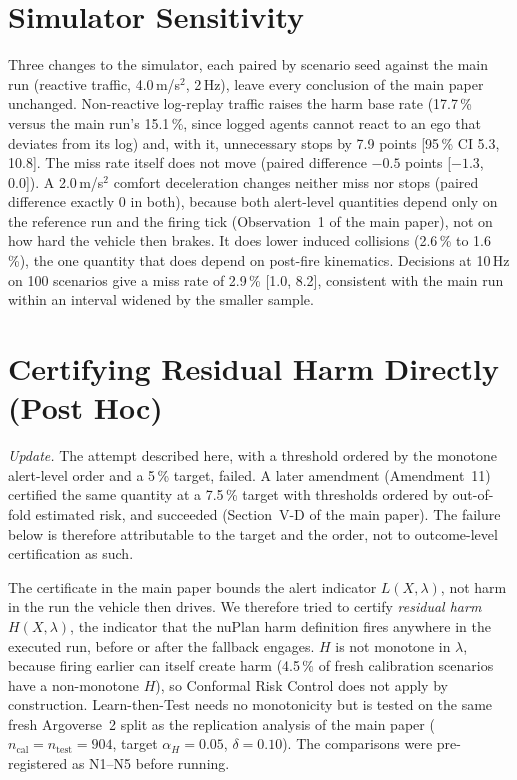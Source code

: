 \documentclass[lettersize,journal]{IEEEtran}
\begin{document}
\section{Simulator Sensitivity}
\label{sec:s-sens}
Three changes to the simulator, each paired by scenario seed against the
main run (reactive traffic, 4.0\,m/s$^2$, 2\,Hz), leave every conclusion
of the main paper unchanged. Non-reactive log-replay traffic raises the
harm base rate (17.7\,\% versus the main run's 15.1\,\%, since logged
agents cannot react to an ego that deviates from its log) and, with it,
unnecessary stops by 7.9 points [95\,\% CI 5.3, 10.8]. The miss rate
itself does not move (paired difference $-0.5$ points [$-1.3$, 0.0]). A
2.0\,m/s$^2$ comfort deceleration changes neither miss nor stops (paired
difference exactly 0 in both), because both alert-level quantities depend
only on the reference run and the firing tick (Observation~1 of the main
paper), not on how hard the vehicle then brakes. It does lower induced
collisions (2.6\,\% to 1.6\,\%), the one quantity that does depend on
post-fire kinematics. Decisions at 10\,Hz on 100 scenarios give a miss
rate of 2.9\,\% [1.0, 8.2], consistent with the main run within an
interval widened by the smaller sample.

\section{Certifying Residual Harm Directly (Post Hoc)}
\label{sec:s-outcome}
\emph{Update.} The attempt described here, with a threshold ordered by the monotone alert-level order and a 5\,\% target, failed. A later amendment (Amendment~11) certified the same quantity at a 7.5\,\% target with thresholds ordered by out-of-fold estimated risk, and succeeded (Section~V-D of the main paper). The failure below is therefore attributable to the target and the order, not to outcome-level certification as such.

The certificate in the main paper bounds the alert indicator
$L(X,\lambda)$, not harm in the run the vehicle then drives. We therefore
tried to certify \emph{residual harm} $H(X,\lambda)$, the indicator that
the nuPlan harm definition fires anywhere in the executed run, before or
after the fallback engages. $H$ is not monotone in $\lambda$, because
firing earlier can itself create harm (4.5\,\% of fresh calibration
scenarios have a non-monotone $H$), so Conformal Risk Control does not
apply by construction. Learn-then-Test needs no monotonicity but is
tested on the same fresh Argoverse~2 split as the replication analysis of
the main paper ($n_{\mathrm{cal}} = n_{\mathrm{test}} = 904$, target
$\alpha_H = 0.05$, $\delta = 0.10$). The comparisons were pre-registered
as N1--N5 before running.
\end{document}
